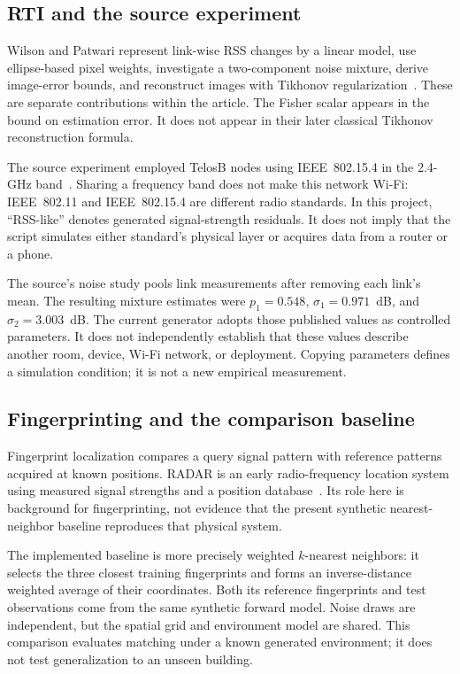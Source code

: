 \documentclass[conference,letterpaper]{IEEEtran}
\begin{document}
\subsection{RTI and the source experiment}
Wilson and Patwari represent link-wise RSS changes by a linear model, use ellipse-based pixel weights, investigate a two-component noise mixture, derive image-error bounds, and reconstruct images with Tikhonov regularization~\cite{wilson2010}. These are separate contributions within the article. The Fisher scalar appears in the bound on estimation error. It does not appear in their later classical Tikhonov reconstruction formula.

The source experiment employed TelosB nodes using IEEE~802.15.4 in the 2.4-GHz band~\cite{wilson2010}. Sharing a frequency band does not make this network Wi-Fi: IEEE~802.11 and IEEE~802.15.4 are different radio standards. In this project, ``RSS-like'' denotes generated signal-strength residuals. It does not imply that the script simulates either standard's physical layer or acquires data from a router or a phone.

The source's noise study pools link measurements after removing each link's mean. The resulting mixture estimates were $p_1=0.548$, $\sigma_1=0.971$~dB, and $\sigma_2=3.003$~dB. The current generator adopts those published values as controlled parameters. It does not independently establish that these values describe another room, device, Wi-Fi network, or deployment. Copying parameters defines a simulation condition; it is not a new empirical measurement.

\subsection{Fingerprinting and the comparison baseline}
Fingerprint localization compares a query signal pattern with reference patterns acquired at known positions. RADAR is an early radio-frequency location system using measured signal strengths and a position database~\cite{bahl2000}. Its role here is background for fingerprinting, not evidence that the present synthetic nearest-neighbor baseline reproduces that physical system.

The implemented baseline is more precisely weighted $k$-nearest neighbors: it selects the three closest training fingerprints and forms an inverse-distance weighted average of their coordinates. Both its reference fingerprints and test observations come from the same synthetic forward model. Noise draws are independent, but the spatial grid and environment model are shared. This comparison evaluates matching under a known generated environment; it does not test generalization to an unseen building.
\end{document}
